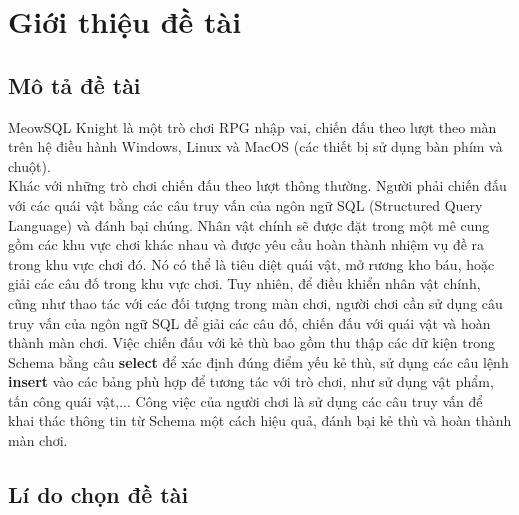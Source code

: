 \section{Giới thiệu đề tài}
\subsection{Mô tả đề tài}
	\hspace*{0.5cm} MeowSQL Knight là một trò chơi RPG nhập vai, chiến đấu theo lượt theo màn trên hệ điều hành Windows, Linux và MacOS (các thiết bị sử dụng bàn phím và chuột).\\
	\hspace*{0.5cm} Khác với những trò chơi chiến đấu theo lượt thông thường. Người phải chiến đấu với các quái vật bằng các câu truy vấn của ngôn ngữ SQL (Structured Query Language) và đánh bại chúng. Nhân vật chính sẽ được đặt trong một mê cung gồm các khu vực chơi khác nhau và được yêu cầu hoàn thành nhiệm vụ đề ra trong khu vực chơi đó. Nó có thể là tiêu diệt quái vật, mở rương kho báu, hoặc giải các câu đố trong khu vực chơi. Tuy nhiên, để
	điều khiển nhân vật chính, cũng như thao tác với các đối tượng trong màn chơi, người chơi cần sử dụng câu truy vấn của ngôn ngữ SQL để giải các câu đố, chiến đấu với quái vật và hoàn thành màn chơi. Việc chiến đấu với kẻ thù bao gồm thu thập các dữ kiện trong Schema bằng câu \textbf{select} để xác định đúng điểm yếu kẻ thù, sử dụng các câu lệnh \textbf{insert} vào các bảng phù hợp để tương tác với trò chơi, như sử dụng vật phẩm, tấn công quái vật,...  Công việc của người chơi là sử dụng các câu truy vấn để khai thác thông tin từ Schema một cách hiệu quả, đánh bại kẻ thù và hoàn thành màn chơi.
	 
\subsection{Lí do chọn đề tài}

